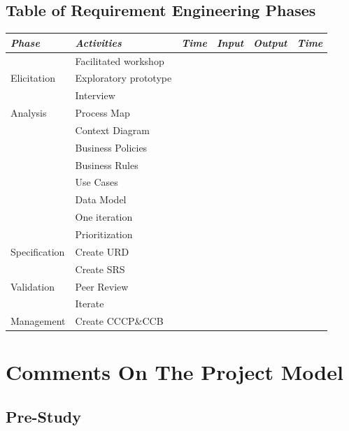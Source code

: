 \documentclass[a4paper]{article}
\begin{document}
\subsection{Table of Requirement Engineering Phases}
\begin{table}[H]
	\centering
	\begin{tabular}{|p{2cm}| p{4cm} |l| p{2cm} | p{1cm}| p{1cm}|}
	\hline
		\textit{Phase} & \textit{Activities} &  \textit{Time} &\textit{Input} & \textit{Output} & \textit{Time} \\
	\hline
		 		  & Facilitated workshop & & & &\\ \cline{2-3}
		Elicitation & Exploratory prototype & & & &\\ \cline{2-3}
				  & Interview & & & &\\ \cline{2-3} 
				  \hline
		Analysis & Process Map & & & &\\ \cline{2-3}
				 & Context Diagram & & & &\\ \cline{2-3}
				 & Business Policies & & & &\\ \cline{2-3}
				 & Business Rules & & & &\\ \cline{2-3}
				 & Use Cases & & & &\\ \cline{2-3}
				 & Data Model & & & &\\ \cline{2-3}
				 & One iteration  & & & &\\ \cline{2-3}
				 & Prioritization & & & &\\ \cline{2-3} 
				 \hline
		Specification & Create URD & & & &\\ \cline{2-3}
				 & Create SRS & & & &\\ \cline{2-3}
				 \hline
		Validation & Peer Review& & & &\\ \cline{2-3}
				 & Iterate & & & &\\ \cline{2-3}
				 \hline
		Management & Create CCCP\&CCB & & & &\\ \cline{2-3} 
		\hline
	
	\end{tabular}
\end{table}

\section{Comments On The Project Model} 
\label{sec:comments_on_the_project_model}

\subsection{Pre-Study}
\label{sub:pre_study}
\end{document}

